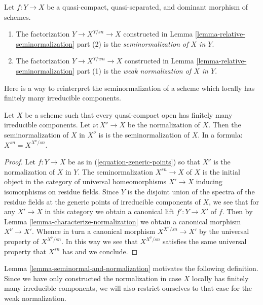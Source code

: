 \begin{definition}
\label{definition-relative-seminormalization}
Let $f : Y \to X$ be a quasi-compact, quasi-separated, and dominant
morphism of schemes.
\begin{enumerate}
\item The factorization $Y \to X^{Y/sn} \to X$ constructed in
Lemma \ref{lemma-relative-seminormalization} part (2)
is the {\it seminormalization of $X$ in $Y$}.
\item The factorization $Y \to X^{Y/wn} \to X$ constructed in
Lemma \ref{lemma-relative-seminormalization} part (1)
is the {\it weak normalization of $X$ in $Y$}.
\end{enumerate}
\end{definition}

\noindent
Here is a way to reinterpret the seminormalization of a scheme
which locally has finitely many irreducible components.

\begin{lemma}
\label{lemma-seminormal-and-normalization}
Let $X$ be a scheme such that every quasi-compact open has
finitely many irreducible components. Let $\nu : X^\nu \to X$
be the normalization of $X$. Then the seminormalization of $X$ in
$X^\nu$ is is the seminormalization of $X$. In a formula:
$X^{sn} = X^{X^\nu/sn}$.
\end{lemma}

\begin{proof}
Let $f : Y \to X$ be as in (\ref{equation-generic-points})
so that $X^\nu$ is the normalization of $X$ in $Y$.
The seminormalization $X^{sn} \to X$ of $X$ is the initial object in the
category of universal homeomorphisms $X' \to X$ inducing isomorphisms on
residue fields. Since $Y$ is the disjoint union of the spectra of the
residue fields at the generic points of irreducible components of $X$,
we see that for any $X' \to X$ in this category we obtain a canonical
lift $f' : Y \to X'$ of $f$. Then by
Lemma \ref{lemma-characterize-normalization}
we obtain a canonical morphism $X^\nu \to X'$.
Whence in turn a canonical morphism $X^{X^\nu/sn} \to X'$
by the universal property of $X^{X^\nu/sn}$.
In this way we see that $X^{X^\nu/sn}$ satisfies the
same universal property that $X^{sn}$ has and we conclude.
\end{proof}

\noindent
Lemma \ref{lemma-seminormal-and-normalization} motivates the
following definition. Since we have only constructed the
normalization in case $X$ locally has finitely many irreducible components,
we will also restrict ourselves to that case for the weak normalization.

